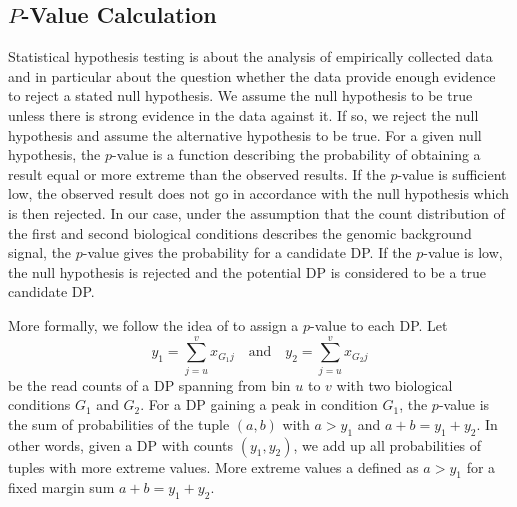\subsection{$P$-Value Calculation}
\label{sec_pvalue}
Statistical hypothesis testing is about the analysis of empirically collected data and in particular about the question whether the data provide enough evidence to reject a stated null hypothesis.
We assume the null hypothesis to be true unless there is strong evidence in the data against it.
If so, we reject the null hypothesis and assume the alternative hypothesis to be true.
For a given null hypothesis, the $p$-value is a function describing the probability of obtaining a result equal or more extreme than the observed results.
If the $p$-value is sufficient low, the observed result does not go in accordance with the null hypothesis which is then rejected.
In our case, under the assumption that the count distribution of the first and second biological conditions describes the genomic background signal, the $p$-value gives the probability for a candidate DP.
If the $p$-value is low, the null hypothesis is rejected and the potential DP is considered to be a true candidate DP.

More formally, we follow the idea of \cite{anders2010} to assign a $p$-value to each DP. 
Let 
$$y_{1}=\sum_{j=u}^v x_{G_1j} \quad \text{and} \quad  y_{2}=\sum_{j=u}^v x_{G_2j}$$
be the read counts of a DP spanning from bin $u$ to $v$ with two biological conditions $G_1$ and $G_2$. 
For a DP gaining a peak in condition $G_1$, the $p$-value is the sum of probabilities of the tuple $(a,b)$ with $a > y_1$ and $a + b = y_1 + y_2$.
In other words, given a DP with counts $(y_1, y_2)$, we add up all probabilities of tuples with more extreme values.
More extreme values a defined as $a > y_1$ for a fixed margin sum $a + b = y_1 + y_2$.

